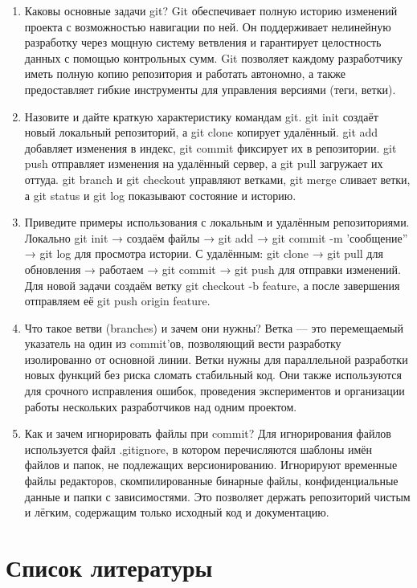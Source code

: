 \documentclass[
  english,
  russian,
  12pt,
  a4paper,
  DIV=11,
  numbers=noendperiod]{scrreprt}
\begin{document}
\begin{enumerate}
  слияния.
\item
  Каковы основные задачи git? Git обеспечивает полную историю изменений
  проекта с возможностью навигации по ней. Он поддерживает нелинейную
  разработку через мощную систему ветвления и гарантирует целостность
  данных с помощью контрольных сумм. Git позволяет каждому разработчику
  иметь полную копию репозитория и работать автономно, а также
  предоставляет гибкие инструменты для управления версиями (теги,
  ветки).
\item
  Назовите и дайте краткую характеристику командам git. git init создаёт
  новый локальный репозиторий, а git clone копирует удалённый. git add
  добавляет изменения в индекс, git commit фиксирует их в репозитории.
  git push отправляет изменения на удалённый сервер, а git pull
  загружает их оттуда. git branch и git checkout управляют ветками, git
  merge сливает ветки, а git status и git log показывают состояние и
  историю.
\item
  Приведите примеры использования с локальным и удалённым репозиториями.
  Локально git init → создаём файлы → git add → git commit -m
  'сообщение'' → git log для просмотра истории. С удалённым: git clone →
  git pull для обновления → работаем → git commit → git push для
  отправки изменений. Для новой задачи создаём ветку git checkout -b
  feature, а после завершения отправляем её git push origin feature.
\item
  Что такое ветви (branches) и зачем они нужны? Ветка --- это
  перемещаемый указатель на один из commit'ов, позволяющий вести
  разработку изолированно от основной линии. Ветки нужны для
  параллельной разработки новых функций без риска сломать стабильный
  код. Они также используются для срочного исправления ошибок,
  проведения экспериментов и организации работы нескольких разработчиков
  над одним проектом.
\item
  Как и зачем игнорировать файлы при commit? Для игнорирования файлов
  используется файл .gitignore, в котором перечисляются шаблоны имён
  файлов и папок, не подлежащих версионированию. Игнорируют временные
  файлы редакторов, скомпилированные бинарные файлы, конфиденциальные
  данные и папки с зависимостями. Это позволяет держать репозиторий
  чистым и лёгким, содержащим только исходный код и документацию.
\end{enumerate}

\chapter*{Список
литературы}\label{ux441ux43fux438ux441ux43eux43a-ux43bux438ux442ux435ux440ux430ux442ux443ux440ux44b}

\printbibliography[heading=none]
\end{document}

